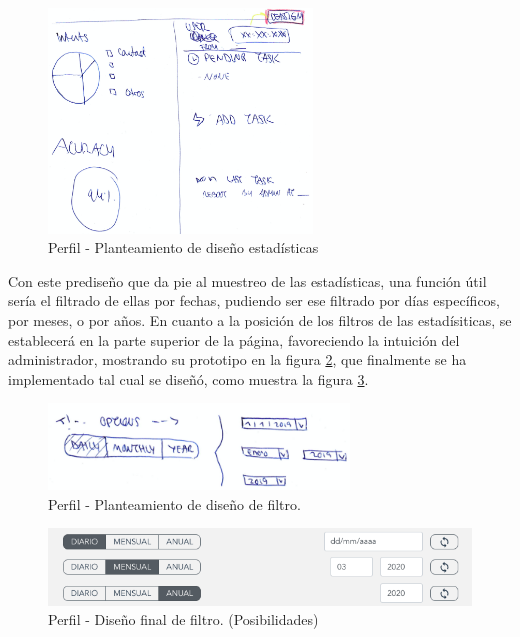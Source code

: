 \begin{enumerate}
\begin{enumerate}
        \begin{figure}[H]   
            \centering
            \includegraphics[width=7cm]{./img/web/perfil/stats.pre.png}
            \caption{Perfil - Planteamiento de diseño estadísticas}
            \label{fig:perfil.tareas2}
        \end{figure}
    \end{enumerate}
    
    Con este prediseño que da pie al muestreo de las estadísticas, una función útil sería el filtrado de ellas por fechas, pudiendo ser ese filtrado por días específicos, por meses, o por años.
    En cuanto a la posición de los filtros de las estadísiticas, se establecerá en la parte superior de la página, favoreciendo la intuición del administrador, mostrando su prototipo en la figura \ref{fig:perfil.filter}, que finalmente se ha implementado tal cual se diseñó, como muestra la figura \ref{fig:perfil.filter.post}.
    \begin{figure}[H]   
        \centering
        \includegraphics[width=8cm]{./img/web/perfil/stats.filter.png}
        \caption{Perfil - Planteamiento de diseño de filtro.}
        \label{fig:perfil.filter}
    \end{figure}
    
    \begin{figure}[H]   
        \centering
        \includegraphics[width=12cm]{./img/web/perfil/filter.post.png}
        \caption{Perfil - Diseño final de filtro. (Posibilidades)}
        \label{fig:perfil.filter.post}
    \end{figure}
    

\end{enumerate}
